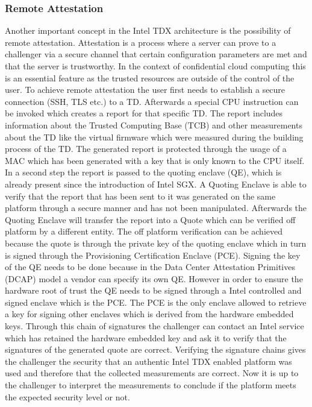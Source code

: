 \documentclass[sigplan,screen,nonacm]{acmart}
\begin{document}
\subsubsection{Remote Attestation}

Another important concept in the Intel TDX architecture is the possibility of remote attestation.
Attestation is a process where a server can prove to a challenger via a secure channel that certain configuration parameters are met and that the server is trustworthy.
In the context of confidential cloud computing this is an essential feature as the trusted resources are outside of the control of the user.
To achieve remote attestation the user first needs to establish a secure connection (SSH, TLS etc.) to a TD.
Afterwards a special CPU instruction can be invoked which creates a report for that specific TD.
The report includes information about the Trusted Computing Base (TCB) and other measurements about the TD like the virtual firmware which were measured during the building process of the TD.
The generated report is protected through the usage of a MAC which has been generated with a key that is only known to the CPU itself.
In a second step the report is passed to the quoting enclave (QE), which is already present since the introduction of Intel SGX.
A Quoting Enclave is able to verify that the report that has been sent to it was generated on the same platform through a secure manner and has not been manipulated.
Afterwards the Quoting Enclave will transfer the report into a Quote which can be verified off platform by a different entity.
The off platform verification can be achieved because the quote is through the private key of the quoting enclave which in turn is signed through the Provisioning Certification Enclave (PCE).
Signing the key of the QE needs to be done because in the Data Center Attestation Primitives (DCAP) model a vendor can specify its own QE.
However in order to ensure the hardware root of trust the QE needs to be signed through a Intel controlled and signed enclave which is the PCE.
The PCE is the only enclave allowed to retrieve a key for signing other enclaves which is derived from the hardware embedded keys\cite{Intel-QVL}.
Through this chain of signatures the challenger can contact an Intel service which has retained the hardware embedded key and ask it to verify that the signatures of the generated quote are correct.
Verifying the signature chains gives the challenger the security that an authentic Intel TDX enabled platform was used and therefore that the collected measurements are correct.
Now it is up to the challenger to interpret the measurements to conclude if the platform meets the expected security level or not.
\end{document}

